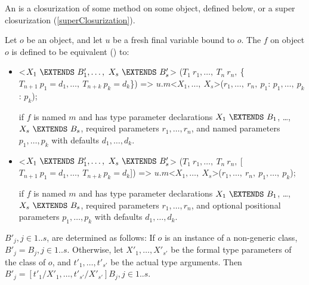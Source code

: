 \documentclass[makeidx]{article}
\begin{document}
\LMHash{}%
An 
is a closurization of some method on some object, defined below,
or a super closurization (\ref{superClosurization}).

\LMHash{}%
Let $o$ be an object, and let $u$ be a fresh final variable bound to $o$.
The  $f$ on object $o$
is defined to be equivalent
() to:
\begin{itemize}
\item
\begin{dartCode}
<$X_1\ \EXTENDS\ B'_1, \ldots,\ X_s\ \EXTENDS\ B'_s$>
($T_1\ r_1, \ldots,\ T_n\ r_n,\ $\{$T_{n+1}\ p_1 = d_1, \ldots,\ T_{n+k}\ p_k = d_k$\}) =>
    $u.m$<$X_1, \ldots,\ X_s$>($r_1, \ldots,\ r_n,\ p_1$: $p_1, \ldots,\ p_k$: $p_k$);
\end{dartCode}
if $f$ is named $m$ and has type parameter declarations
$X_1\ \EXTENDS\ B_1$, \ldots,\ $X_s\ \EXTENDS\ B_s$,
required parameters $r_1, \ldots, r_n$,
and named parameters $p_1, \ldots, p_k$ with defaults $d_1, \ldots, d_k$.
\item
\begin{dartCode}
<$X_1\ \EXTENDS\ B'_1, \ldots,\ X_s\ \EXTENDS\ B'_s$>
($T_1\ r_1, \ldots,\ T_n\ r_n,\ $[$T_{n+1}\ p_1 = d_1, \ldots,\ T_{n+k}\ p_k = d_k$]) =>
    $u.m$<$X_1, \ldots,\ X_s$>($r_1, \ldots,\ r_n,\ p_1, \ldots,\ p_k$);
\end{dartCode}
if $f$ is named $m$ and has type parameter declarations
$X_1\ \EXTENDS\ B_1$, \ldots,\ $X_s\ \EXTENDS\ B_s$,
required parameters $r_1, \ldots, r_n$,
and optional positional parameters
$p_1, \ldots, p_k$ with defaults $d_1, \ldots, d_k$.
\end{itemize}

\LMHash{}%
$B'_j, j \in 1 .. s$, are determined as follows:
If $o$ is an instance of a non-generic class, $B'_j = B_j, j \in 1 .. s$.
Otherwise, let $X'_1, \ldots, X'_{s'}$ be the formal type parameters of the class of $o$,
and $t'_1, \ldots, t'_{s'}$ be the actual type arguments.
Then $B'_j = [t'_1/X'_1, \ldots, t'_{s'}/X'_{s'}]B_j, j \in 1 .. s$.
\end{document}
